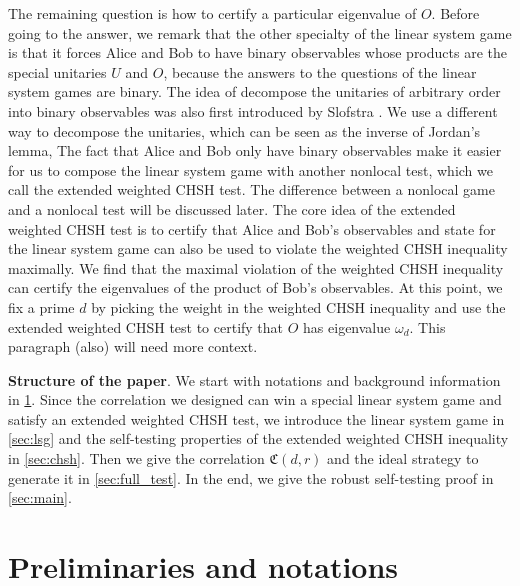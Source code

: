 \documentclass[11pt,letterpaper]{article}
\newcommand{\1}{\mathbb{1}}
\newcommand{\fC}{\mathfrak{C}}
\def\carl#1{{\color{blue} #1}}
\theoremstyle{definition}
\begin{document}
The remaining question is how to certify a particular eigenvalue of $O$. Before going to the answer,
we remark that 
the other specialty of the linear system game is that it forces Alice and Bob to have binary observables
whose products are the special unitaries $U$ and $O$, because the answers to the questions of the 
linear system games are binary. 
The idea of decompose the unitaries of arbitrary order into binary observables was also first introduced by Slofstra \cite{slofstra2017}.
We use a different way to decompose the unitaries, which can be seen as the inverse of Jordan's lemma, 
The fact that Alice and Bob only have binary observables make it easier for us 
to compose the linear system game with another nonlocal test, which we call the extended weighted CHSH test.
The difference between a nonlocal game and a nonlocal test will be discussed later.
The core idea of the extended weighted CHSH test is to certify that Alice and Bob's observables and state 
for the linear system game can also be used to violate the weighted CHSH inequality \cite{acin2012} maximally.
We find that the maximal violation of the weighted CHSH inequality can certify the eigenvalues of the product
of Bob's observables. 
At this point, we fix a prime $d$ by picking the weight in the weighted CHSH inequality and 
use the extended weighted CHSH test to certify that
$O$ has eigenvalue $\omega_d$.
\carl{This paragraph (also) will need more context.}

\textbf{Structure of the paper}.
We start with notations and background information in \cref{sec:prelim}.
Since the correlation we designed can win a special linear system game and satisfy
an extended weighted CHSH test, we introduce the linear system game
in \cref{sec:lsg} and the self-testing properties of the extended weighted CHSH inequality in \cref{sec:chsh}. 
Then we give the correlation $\fC(d,r)$ and the ideal strategy to generate it in \cref{sec:full_test}.
In the end, we give the robust self-testing proof in \cref{sec:main}. 

\section{Preliminaries and notations}
\label{sec:prelim}
\end{document}
